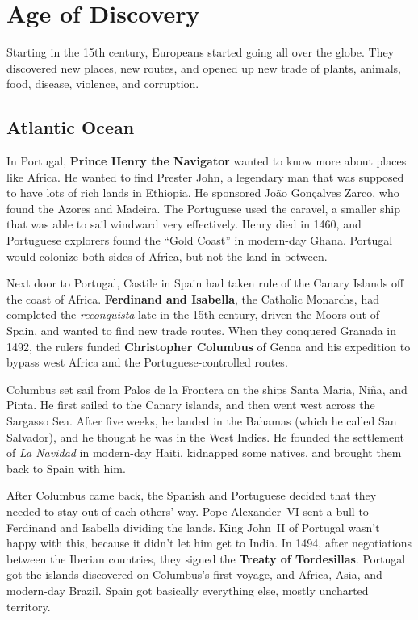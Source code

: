 \section{Age of Discovery}

Starting in the 15th century, Europeans started going all over the globe.
They discovered new places, new routes,
and opened up new trade of plants, animals, food, disease, violence, and corruption.

\subsection*{Atlantic Ocean}

In Portugal, \textbf{Prince Henry the Navigator} wanted to know more about places like Africa.
He wanted to find Prester John,
a legendary man that was supposed to have lots of rich lands in Ethiopia.
He sponsored Jo\~ao Gon\c{c}alves Zarco, who found the Azores and Madeira.
The Portuguese used the caravel, a smaller ship that was able to sail windward very effectively.
Henry died in 1460, and Portuguese explorers found the ``Gold Coast'' in modern-day Ghana.
Portugal would colonize both sides of Africa, but not the land in between.

Next door to Portugal,
Castile in Spain had taken rule of the Canary Islands off the coast of Africa.
\textbf{Ferdinand and Isabella}, the Catholic Monarchs, had completed the \textit{reconquista}
late in the 15th century, driven the Moors out of Spain, and wanted to find new trade routes.
When they conquered Granada in 1492, the rulers funded \textbf{Christopher Columbus} of Genoa
and his expedition to bypass west Africa and the Portuguese-controlled routes.

Columbus set sail from Palos de la Frontera on the ships Santa Maria, Ni\~na, and Pinta.
He first sailed to the Canary islands, and then went west across the Sargasso Sea.
After five weeks, he landed in the Bahamas (which he called San Salvador),
and he thought he was in the West Indies.
He founded the settlement of \textit{La Navidad} in modern-day Haiti,
kidnapped some natives, and brought them back to Spain with him.

After Columbus came back,
the Spanish and Portuguese decided that they needed to stay out of each others' way.
Pope Alexander~VI sent a bull to Ferdinand and Isabella dividing the lands.
King John~II of Portugal wasn't happy with this, because it didn't let him get to India.
In 1494, after negotiations between the Iberian countries,
they signed the \textbf{Treaty of Tordesillas}.
Portugal got the islands discovered on Columbus's first voyage,
and Africa, Asia, and modern-day Brazil.
Spain got basically everything else, mostly uncharted territory.


